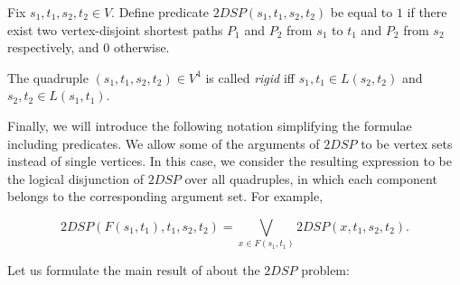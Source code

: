 \begin{definition}
Fix $s_1, t_1, s_2, t_2 \in V$. Define predicate $2DSP(s_1, t_1, s_2, t_2)$ be equal to $1$ if there exist two vertex-disjoint shortest paths $P_1$ and $P_2$ from $s_1$ to $t_1$ and $P_2$ from $s_2$ respectively, and $0$ otherwise.
\end{definition}

\begin{definition}
The quadruple $(s_1, t_1, s_2, t_2) \in V^4$ is called \textit{rigid} iff $s_1, t_1 \in L(s_2, t_2)$ and $s_2, t_2 \in L(s_1, t_1)$.
\end{definition}

Finally, we will introduce the following notation simplifying the formulae including predicates. We allow some of the arguments of $2DSP$ to be vertex sets instead of single vertices. In this case, we consider the resulting expression to be the logical disjunction of $2DSP$ over all quadruples, in which each component belongs to the corresponding argument set. For example,

\begin{equation}
2DSP(F(s_1, t_1), t_1, s_2, t_2) = \bigvee\limits_{x \in F(s_1, t_1)} 2DSP(x, t_1, s_2, t_2).
\end{equation}

Let us formulate the main result of \cite{ET} about the $2DSP$ problem:

